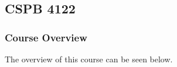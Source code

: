 \clearpage

\renewcommand{\ChapTitle}{\CSPBIV}
\renewcommand{\SectionTitle}{CSPB 4122}

\chapter{\ChapTitle}
\section{\SectionTitle}

\subsection{Course Overview}

The overview of this course can be seen below.

